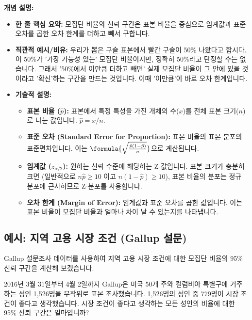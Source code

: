 \documentclass[11pt,a4paper]{article}
\theoremstyle{definition}
\begin{document}
\textbf{개념 설명:}
\begin{itemize}
    \item \textbf{한 줄 핵심 요약:} 모집단 비율의 신뢰 구간은 표본 비율을 중심으로 임계값과 표준 오차를 곱한 오차 한계를 더하고 빼서 구합니다.
    \item \textbf{직관적 예시/비유:} 우리가 뽑은 구슬 표본에서 빨간 구슬이 50\% 나왔다고 합시다. 이 50\%가 '가장 가능성 있는' 모집단 비율이지만, 정확히 50\%라고 단정할 수는 없습니다. 그래서 '50\%에서 이만큼 더하고 빼면' 실제 모집단 비율이 그 안에 있을 것이라고 '확신'하는 구간을 만드는 것입니다. 이때 '이만큼'이 바로 오차 한계입니다.
    \item \textbf{기술적 설명:}
        \begin{itemize}
            \item \textbf{표본 비율 ($\hat{p}$):} 표본에서 특정 특성을 가진 개체의 수($x$)를 전체 표본 크기($n$)로 나눈 값입니다. $\hat{p} = x/n$.
            \item \textbf{표준 오차 (Standard Error for Proportion):} 표본 비율의 표본 분포의 표준편차입니다. 이는 $\formula{\sqrt{\frac{\hat{p}(1-\hat{p})}{n}}}$으로 계산됩니다.
            \item \textbf{임계값 ($z_{\alpha/2}$):} 원하는 신뢰 수준에 해당하는 Z-값입니다. 표본 크기가 충분히 크면 (일반적으로 $n\hat{p} \ge 10$ 이고 $n(1-\hat{p}) \ge 10$), 표본 비율의 분포는 정규 분포에 근사하므로 Z-분포를 사용합니다.
            \item \textbf{오차 한계 (Margin of Error):} 임계값과 표준 오차를 곱한 값입니다. 이는 표본 비율이 모집단 비율과 얼마나 차이 날 수 있는지를 나타냅니다.
        \end{itemize}
\end{itemize}

\subsection{예시: 지역 고용 시장 조건 (Gallup 설문)}

Gallup 설문조사 데이터를 사용하여 지역 고용 시장 조건에 대한 모집단 비율의 95\% 신뢰 구간을 계산해 보겠습니다.

\begin{tcolorbox}[title=슬라이드 70: 지역 고용 시장 조건이 좋은가? (1/2)]
2016년 3월 31일부터 4월 2일까지 Gallup은 미국 50개 주와 컬럼비아 특별구에 거주하는 성인 1,526명을 무작위로 표본 조사했습니다. 1,526명의 성인 중 779명이 시장 조건이 좋다고 생각했습니다.
시장 조건이 좋다고 생각하는 모든 성인의 비율에 대한 95\% 신뢰 구간은 얼마입니까?
\end{tcolorbox}
\end{document}
